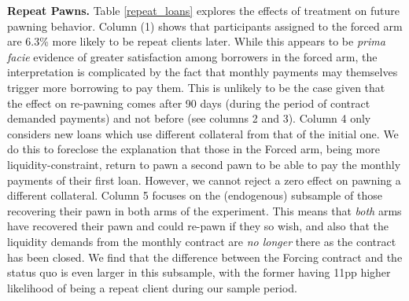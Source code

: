 \documentclass[ecta,nameyear,final]{econsocart}
\begin{document}
\noindent \textbf{Repeat Pawns.}
Table \ref{repeat_loans} explores the effects of treatment on future pawning behavior.
Column (1) shows that participants assigned to the forced arm are 6.3\% more likely to be repeat clients later. %
While this appears to be \emph{prima facie} evidence of greater satisfaction among borrowers in the forced arm, the interpretation is complicated by the fact that monthly payments may themselves trigger more borrowing to pay them. This is unlikely to be the case given that the effect on re-pawning comes after 90 days (during the period of contract demanded payments) and not before  (see columns 2 and 3). Column 4 only considers new loans which use different collateral from that of the initial one. We do this to foreclose the explanation that those in the Forced arm, being more liquidity-constraint, return to pawn a second pawn to be able to pay the monthly payments of their first loan. However, we cannot reject a zero effect on pawning a different collateral. Column 5 focuses on the (endogenous) subsample of those recovering their pawn in both arms of the experiment. This means that \textit{both} arms have recovered their pawn and could re-pawn if they so wish, and also that the liquidity demands from the monthly contract are \textit{no longer} there as the contract has been closed.  We find that the difference between the Forcing contract and the status quo is even larger in this subsample, with the former having 11pp higher likelihood of being a repeat client during our sample period.
\end{document}
